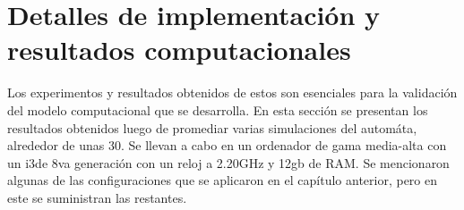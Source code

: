 \chapter{Detalles de implementación y resultados computacionales}\label{chapter:implementation}

Los experimentos y resultados obtenidos de estos son esenciales para la validaci\'on del modelo computacional que se desarrolla. En esta sección se presentan los resultados obtenidos luego de promediar varias simulaciones del autom\'ata, alrededor de unas 30. Se llevan a cabo en un ordenador de gama media-alta con un i3de 8va generaci\'on con un reloj a 2.20GHz y 12gb de RAM. Se mencionaron algunas de las configuraciones que se aplicaron en el cap\'itulo anterior, pero en este se suministran las restantes.

\begin{table}[!ht]
    \begin{center}
    \vspace*{-0.5cm}
    \end{center}
    \caption[Valores de los par\'ametros de construcci\'on de la red, de la asignaci\'on de estados iniciales y de las regiones y vectores de nutrientes]{Valores de los par\'ametros de construcci\'on de la red, de la asignaci\'on de estados iniciales y de las regiones y vectores de nutrientes. Se utiliza la escala $1:3$ donde el tiempo transcurrido entre las generaciones del aut\'omata $n$ y $n+1$ se corresponde a $72$ horas y cada celda del aut\'omata contiene $9$ c\'elulas reales.}
    \label{table-net-params}
    \end{table}


